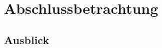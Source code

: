 
\chapter{Abschlussbetrachtung} %
\label{cha:abschlussbetrachtung}



\section{Ausblick} %
\label{sec:ausblick}


